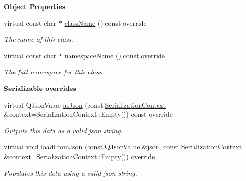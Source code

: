 \begin{Indent}\textbf{ Object Properties}\par
\begin{DoxyCompactItemize}
\item 
virtual const char $\ast$ \mbox{\hyperlink{classrev_1_1_post_processing_chain_a500b7e99127d6a31215edf1b14fdd7ee}{class\+Name}} () const override
\begin{DoxyCompactList}\small\item\em The name of this class. \end{DoxyCompactList}\item 
virtual const char $\ast$ \mbox{\hyperlink{classrev_1_1_post_processing_chain_a8fc3834c337ee526386f622ef314cae6}{namespace\+Name}} () const override
\begin{DoxyCompactList}\small\item\em The full namespace for this class. \end{DoxyCompactList}\end{DoxyCompactItemize}
\end{Indent}
\begin{Indent}\textbf{ Serializable overrides}\par
\begin{DoxyCompactItemize}
\item 
\mbox{\label{classrev_1_1_post_processing_chain_abed60739114ddb3db67320172745eaef}} 
virtual Q\+Json\+Value \mbox{\hyperlink{classrev_1_1_post_processing_chain_abed60739114ddb3db67320172745eaef}{as\+Json}} (const \mbox{\hyperlink{structrev_1_1_serialization_context}{Serialization\+Context}} \&context=Serialization\+Context\+::\+Empty()) const override
\begin{DoxyCompactList}\small\item\em Outputs this data as a valid json string. \end{DoxyCompactList}\item 
\mbox{\label{classrev_1_1_post_processing_chain_a07ba52178dd0feb60f1e41ebbd800ea0}} 
virtual void \mbox{\hyperlink{classrev_1_1_post_processing_chain_a07ba52178dd0feb60f1e41ebbd800ea0}{load\+From\+Json}} (const Q\+Json\+Value \&json, const \mbox{\hyperlink{structrev_1_1_serialization_context}{Serialization\+Context}} \&context=Serialization\+Context\+::\+Empty()) override
\begin{DoxyCompactList}\small\item\em Populates this data using a valid json string. \end{DoxyCompactList}\end{DoxyCompactItemize}
\end{Indent}
